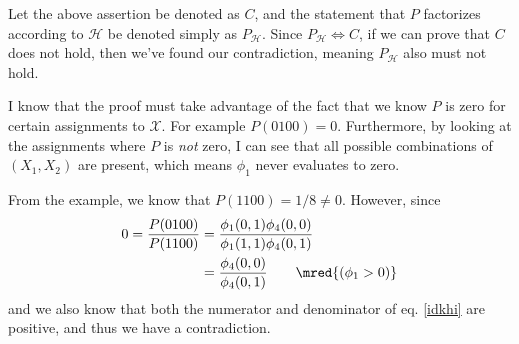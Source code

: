 \documentclass[11pt]{article}
\newcommand\myspace[1][]{\vspace{#1\bigskipamount}}
\newcommand\p{\Needspace{10\baselineskip} \noindent}
\begin{document}
\begin{example}[Exercise 4.1]
\begin{compactitem}
\begin{compactenum}
			Let the above assertion be denoted as $C$, and the statement that $P$ factorizes according to $\mathcal{H}$ be denoted simply as $P_{\mathcal H}$. Since $P_{\mathcal H} \iff C$, if we can prove that $C$ does not hold, then we've found our contradiction, meaning $P_{\mathcal{H}}$ also must not hold.
			
			\item I know that the proof must take advantage of the fact that we know $P$ is zero for certain assignments to $\mathcal{X}$. For example $P(0100) = 0$. Furthermore, by looking at the assignments where $P$ is \textit{not} zero, I can see that all possible combinations of $(X_1, X_2)$ are present, which means $\phi_1$ never evaluates to zero.
			
			\item From the example, we know that $P(1100) = 1/8 \ne 0$. However, since
			\begin{align}
				0 = \frac{P(0100)}{P(1100)} &= \frac{\phi_1(0, 1)\phi_4(0, 0)}{\phi_1(1, 1)\phi_4(0, 1)} \\
			   &= \frac{\phi_4(0, 0)}{\phi_4(0, 1)} \qquad \mred{(\phi_1 > 0)} \label{idkhi}
			\end{align}
			and we also know that both the numerator and denominator of eq. \ref{idkhi} are positive, and thus we have a contradiction. 
		\end{compactenum}
	\end{compactitem}
\end{example}

\begin{comment}
\myspace
\p \blue{Exercise 4.2}. Show that for any constants $\lambda^1$ and $\lambda^0$, and 
\begin{align}
	\epsilon'_1(a, b^i) &:= \epsilon_1(a, b^i) + \lambda^i \\
	\epsilon'_2(b^i, c) &:= \epsilon_2(b^i, c) - \lambda^i
\end{align}
that the $\epsilon'_1$ and $\epsilon'_2$ result in equivalent distributions as the originals. Since we'll be using the misconception network for the next few problems, I've redrawn it below for convenience. 
\begin{center}
	\begin{tikzpicture}[font=\sffamily,node distance=1.cm,->,>=latex,auto,line width=0.4mm]
	
	
	\tikzset{node st/.style={state, draw=none,
			fill=gray!30!white,
			text=blue!60!white}}
	\tikzset{node obs/.style={state, draw=none,
			fill=gray!60!black,
			text=blue!20!white}}
	
	\node[node st] (A) {A};
	\node[below=2em of A] (dummy) {};
	\node[node st, left=of dummy] (D) {D};
	\node[node st, right=of dummy] (B) {B};  
	\node[node st, below=4em of A] (C) {C};
	
	\draw[every loop,
	auto=right,
	draw=blue!30!gray]
	(A) edge[-] node{} (B)
	(A) edge[-] node{} (D)
	(B) edge[-] node{} (C)
	(D) edge[-] node{} (C);
	\end{tikzpicture}
\end{center}
\end{comment}
\end{document}
